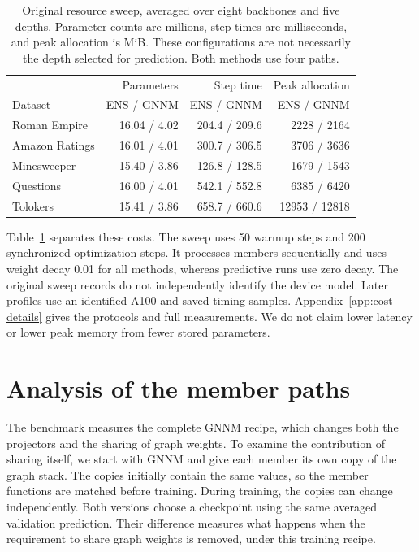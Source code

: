 \documentclass{article}
\begin{document}
\begin{table}[t]
\centering\small
\setlength{\tabcolsep}{4pt}
\caption{Original resource sweep, averaged over eight backbones and five depths. Parameter counts are millions, step times are milliseconds, and peak allocation is MiB. These configurations are not necessarily the depth selected for prediction. Both methods use four paths.}
\label{tab:resource-main}
\begin{tabular}{lrrr}
\toprule
& Parameters & Step time & Peak allocation\\
Dataset & ENS / GNNM & ENS / GNNM & ENS / GNNM\\
\midrule
Roman Empire & 16.04 / 4.02 & 204.4 / 209.6 & 2228 / 2164\\
Amazon Ratings & 16.01 / 4.01 & 300.7 / 306.5 & 3706 / 3636\\
Minesweeper & 15.40 / 3.86 & 126.8 / 128.5 & 1679 / 1543\\
Questions & 16.00 / 4.01 & 542.1 / 552.8 & 6385 / 6420\\
Tolokers & 15.41 / 3.86 & 658.7 / 660.6 & 12953 / 12818\\
\bottomrule
\end{tabular}
\end{table}

Table~\ref{tab:resource-main} separates these costs. The sweep uses 50 warmup steps and 200 synchronized optimization steps. It processes members sequentially and uses weight decay 0.01 for all methods, whereas predictive runs use zero decay. The original sweep records do not independently identify the device model. Later profiles use an identified A100 and saved timing samples. Appendix~\ref{app:cost-details} gives the protocols and full measurements. We do not claim lower latency or lower peak memory from fewer stored parameters.

\section{Analysis of the member paths}\label{sec:analysis}
The benchmark measures the complete GNNM recipe, which changes both the projectors and the sharing of graph weights. To examine the contribution of sharing itself, we start with GNNM and give each member its own copy of the graph stack. The copies initially contain the same values, so the member functions are matched before training. During training, the copies can change independently. Both versions choose a checkpoint using the same averaged validation prediction. Their difference measures what happens when the requirement to share graph weights is removed, under this training recipe.
\end{document}
